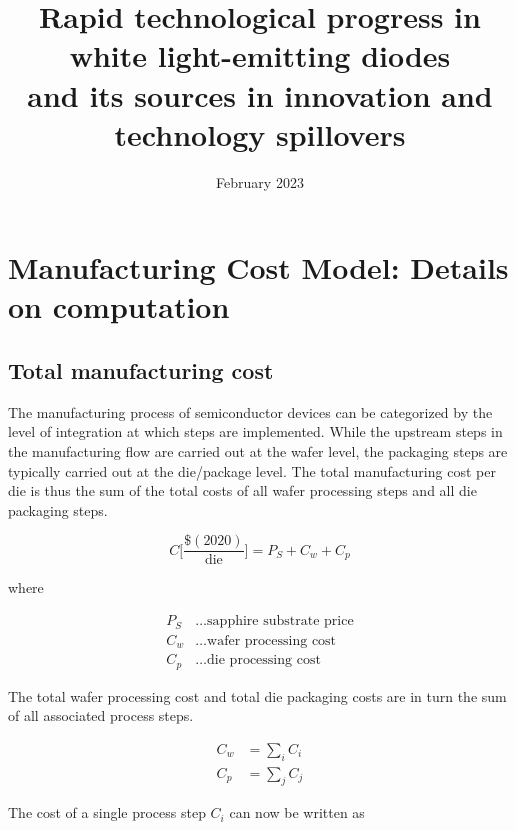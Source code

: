 \documentclass[10pt]{article}
\title{Rapid technological progress in white light-emitting diodes \\ and its sources in innovation and technology spillovers  }
\date{February 2023}
\begin{document}
\setlength{\fboxsep}{10pt}

\tableofcontents

\newpage

\section{Manufacturing Cost Model: Details on computation}

\subsection{Total manufacturing cost}

The manufacturing process of semiconductor devices can be categorized by the level of integration at which steps are implemented. While the upstream steps in the manufacturing flow are carried out at the wafer level, the packaging steps are typically carried out at the die/package level. The total manufacturing cost per die is thus the sum of the total costs of all wafer processing steps and all die packaging steps.

\begin{equation}
\label{eqn:cost_sum}
    C \bigg[ \frac{ \$(2020) }{ \text{die} } \bigg] = P_S + C_w + C_p
\end{equation}

where

\begin{align*}
    P_S &\dots \text{sapphire substrate price} \\
    C_w &\dots \text{wafer processing cost} \\
    C_p &\dots \text{die processing cost}
\end{align*}

The total wafer processing cost and total die packaging costs are in turn the sum of all associated process steps.

\begin{align}
	C_w &= \sum_i C_i \\
	C_p &= \sum_j C_j
\end{align}

The cost of a single process step $C_i$ can now be written as
\end{document}

